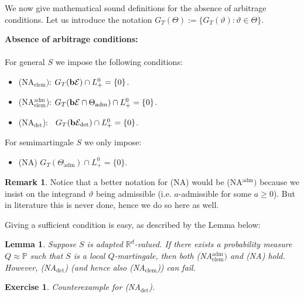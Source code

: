 \documentclass[12pt,a4paper, twoside]{article}
\newtheorem{lem}{Lemma}[section]
\newtheorem{exe}{Exercise}[section]
\theoremstyle{definition}
\newtheorem{rem}{Remark}[section]
\newcommand{\PP}{\mathbb{P}} %
\newcommand{\simple}{\textbf{\text{b}}\mathcal{E}}
\newcommand{\verysimple}{\textbf{\text{b}}\mathcal{E}_{\text{det}}}
\begin{document}
\newpage
We now give mathematical sound definitions for the absence of arbitrage conditions. Let us introduce the notation $G_T( \Theta):= \{ G_T( \vartheta) : \vartheta \in \Theta\}$.
\begin{mdframed}[backgroundcolor=yellow!20, topline=true, linewidth=2.0pt] \textbf{Absence of arbitrage conditions:}\\
\\
For general $S$ we impose the following conditions:
\begin{itemize}
\item (NA$_{\text{elem}})$: $G_T(\simple) \cap L_+^0 = \{ 0 \}$. 
\item (NA$_{\text{elem}}^\text{adm}$): $G_T(\simple \cap \Theta_\text{adm}) \cap L_+^0 = \{0\}$. 
\item (NA$_\text{det}$): \ $G_T(\verysimple) \cap L_+^0 = \{0\}$.
\end{itemize}
For semimartingale $S$ we only impose:
\begin{itemize}
\item (NA) $G_T( \Theta_\text{adm}) \cap L_+^0 = \{0 \}$. 
\end{itemize}
\end{mdframed}
\begin{rem} Notice that a better notation for (NA) would be (NA$^\text{adm})$ because we insist on the integrand $\vartheta$ being admissible (i.e. $a$-admissible for some $a \geq 0$). But in literature this is never done, hence we do so here as well. 
\end{rem}
Giving a sufficient condition is easy, as described by the Lemma below: 
\begin{lem} \label{L21} Suppose $S$ is adapted $\mathbb{R}^d$-valued. If there exists a probability measure $Q \approx \PP$ such that $S$ is a local $Q$-martingale, then both (NA$_\text{elem}^\text{adm})$ and (NA) hold. However, (NA$_\text{det}$) (and hence also (NA$_\text{elem}$)) can fail. 
\end{lem}
\begin{exe} \label{ex2} Counterexample for (NA$_\text{det}$). 
\end{exe}
\end{document}
